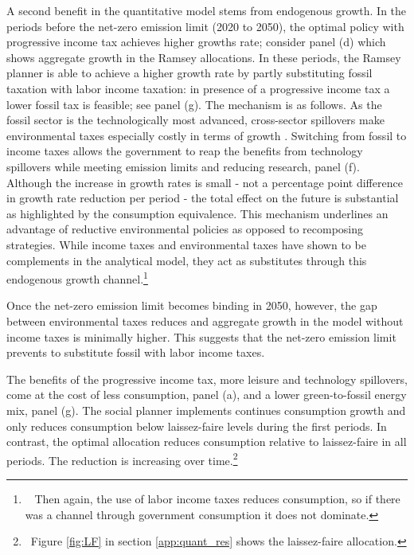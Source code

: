 A second benefit in the quantitative model stems from endogenous growth. 
In the periods before the net-zero emission limit (2020 to 2050), the optimal policy with progressive income tax achieves higher growths rate; consider panel (d) which shows aggregate growth in the Ramsey allocations. In these periods, the Ramsey planner is able to achieve a higher growth rate by partly substituting fossil taxation with labor income taxation: in presence of a progressive income tax a lower fossil tax is feasible; see panel (g). The mechanism is as follows. 
As the fossil sector is the technologically most advanced,  cross-sector spillovers make environmental taxes especially costly in terms of growth \citep[this mechanism has been discussed in][]{Fried2018ClimateAnalysis}. Switching from fossil to income taxes allows the government to reap the benefits from technology spillovers while meeting emission limits and reducing research, panel (f). Although the increase in growth rates is small - not a percentage point difference in growth rate reduction per period - the total effect on the future is substantial as highlighted by the consumption equivalence. 
 This mechanism underlines an advantage of reductive environmental policies as opposed to recomposing strategies.  While income taxes and environmental taxes have shown to be complements in the analytical model, they act as substitutes through this endogenous growth channel.\footnote{\  Then again, the use of labor income taxes reduces consumption, so if there was a channel through government consumption it does not dominate.}

Once the net-zero emission limit becomes binding in 2050, however, the gap between environmental taxes reduces and aggregate growth in the model without income taxes is minimally higher.   This suggests that the net-zero emission limit prevents to substitute fossil with labor income taxes. 

The benefits of the progressive income tax, more leisure and technology spillovers, come at the cost of less consumption, panel (a),  and a lower green-to-fossil energy mix, panel (g). The social planner implements continues consumption growth and only reduces consumption below laissez-faire levels during the first periods. In contrast, the optimal allocation reduces consumption relative to laissez-faire in all periods. The reduction is increasing over time.\footnote{\ Figure \ref{fig:LF} in section \ref{app:quant_res} shows the laissez-faire allocation. } 

